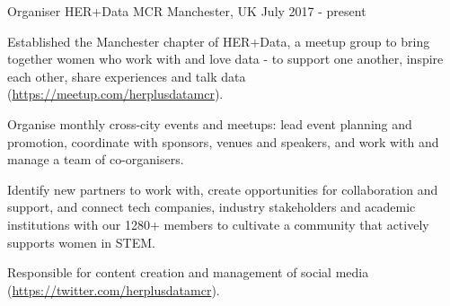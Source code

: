\begin{cventries}
{\begin{cvitems}
      \end{cvitems}
    }    
\cventry
    {Organiser}
    {HER+Data MCR}
    {Manchester, UK}
    {July 2017 - present}
    {
      \begin{cvitems}
        \item {Established the Manchester chapter of HER+Data, a meetup group to bring together women who work with and love data - to support one another, inspire each other, share experiences and talk data (\url{https://meetup.com/herplusdatamcr}).}
        \item {Organise monthly cross-city events and meetups: lead event planning and promotion, coordinate with sponsors, venues and speakers, and work with and manage a team of co-organisers.}
        \item {Identify new partners to work with, create opportunities for collaboration and support, and connect tech companies, industry stakeholders and academic institutions with our 1280+ members to cultivate a community that actively supports women in STEM.}
        \item {Responsible for content creation and management of social media (\url{https://twitter.com/herplusdatamcr}).}
      \end{cvitems}
    }
\end{cventries}
